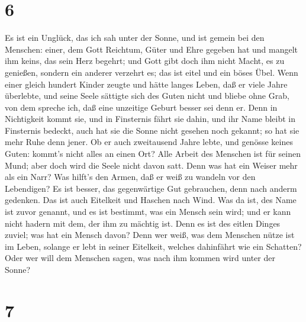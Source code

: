 \hypertarget{section-5}{%
\section{6}\label{section-5}}

 Es ist ein Unglück, das ich sah unter der Sonne, und ist
gemein bei den Menschen:  einer, dem Gott Reichtum, Güter
und Ehre gegeben hat und mangelt ihm keins, das sein Herz begehrt; und
Gott gibt doch ihm nicht Macht, es zu genießen, sondern ein anderer
verzehrt es; das ist eitel und ein böses Übel.  Wenn einer
gleich hundert Kinder zeugte und hätte langes Leben, daß er viele Jahre
überlebte, und seine Seele sättigte sich des Guten nicht und bliebe ohne
Grab, von dem spreche ich, daß eine unzeitige Geburt besser sei denn er.
 Denn in Nichtigkeit kommt sie, und in Finsternis fährt sie
dahin, und ihr Name bleibt in Finsternis bedeckt,  auch hat
sie die Sonne nicht gesehen noch gekannt; so hat sie mehr Ruhe denn
jener.  Ob er auch zweitausend Jahre lebte, und genösse
keines Guten: kommt's nicht alles an einen Ort?  Alle Arbeit
des Menschen ist für seinen Mund; aber doch wird die Seele nicht davon
satt.  Denn was hat ein Weiser mehr als ein Narr? Was
hilft's den Armen, daß er weiß zu wandeln vor den Lebendigen?
 Es ist besser, das gegenwärtige Gut gebrauchen, denn nach
anderm gedenken. Das ist auch Eitelkeit und Haschen nach Wind.
 Was da ist, des Name ist zuvor genannt, und es ist
bestimmt, was ein Mensch sein wird; und er kann nicht hadern mit dem,
der ihm zu mächtig ist.  Denn es ist des eitlen Dinges
zuviel; was hat ein Mensch davon?  Denn wer weiß, was dem
Menschen nütze ist im Leben, solange er lebt in seiner Eitelkeit,
welches dahinfährt wie ein Schatten? Oder wer will dem Menschen sagen,
was nach ihm kommen wird unter der Sonne?

\hypertarget{section-6}{%
\section{7}\label{section-6}}

